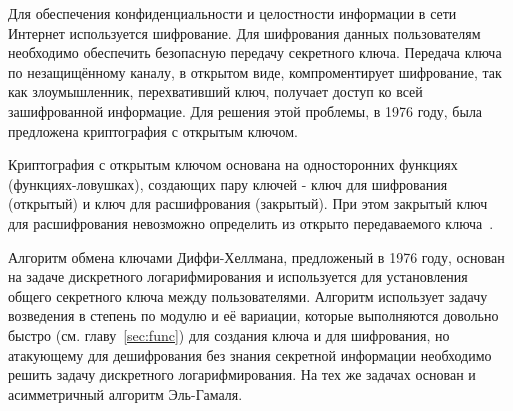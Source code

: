 \documentclass[times,specification,annotation]{itmo-student-thesis}
\begin{document}





\tableofcontents

\startprefacepage

Для обеспечения конфиденциальности и целостности информации в сети Интернет используется шифрование.
Для шифрования данных пользователям необходимо обеспечить безопасную передачу секретного ключа.
Передача ключа по незащищённому каналу, в открытом виде, компроментирует шифрование, так как
злоумышленник, перехвативший ключ, получает доступ ко всей зашифрованной информацие.
Для решения этой проблемы, в 1976 году, была предложена  криптография с открытым ключом.

Криптография с открытым ключом основана на односторонних функциях (функциях-ловушках),
создающих пару ключей - ключ для шифрования (открытый) и ключ для расшифрования (закрытый).
При этом закрытый ключ для расшифрования  невозможно определить из открыто передаваемого ключа~\cite{dif77}.

Алгоритм обмена ключами Диффи-Хеллмана, предложеный в 1976 году, основан на задаче дискретного логарифмирования
и используется для установления общего секретного ключа между пользователями.
Алгоритм  использует задачу возведения в степень по модулю и её вариации, которые выполняются довольно быстро
(см. главу~\ref{sec:func}) для создания ключа и для шифрования, но атакующему для дешифрования без знания секретной
информации необходимо решить задачу дискретного логарифмирования.
На тех же задачах основан и асимметричный алгоритм Эль-Гамаля.
\end{document}
